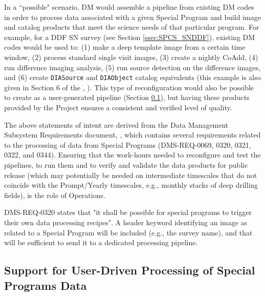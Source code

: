 \documentclass[DM,lsstdoc,toc]{lsstdoc}
\begin{document}
In a ``possible" scenario, DM would assemble a pipeline from existing DM codes in order to process data associated with a given Special Program and build image and catalog products that meet the science needs of that particular program. For example, for a DDF SN survey (see Section \ref{ssec:SPCS_SNDDF}), existing DM codes would be used to: (1) make a deep template image from a certain time window, (2) process standard single visit images, (3) create a nightly CoAdd, (4) run difference imaging analysis, (5) run source detection on the difference images, and (6) create \texttt{DIASource} and \texttt{DIAObject} catalog equivalents (this example is also given in Section 6 of the \DPDD, ). This type of reconfiguration would also be possible to create as a user-generated pipeline (Section \ref{ssec:dmplans_user}), but having these products provided by the Project ensures a consistent and verified level of quality. %

The above statements of intent are derived from the Data Management Subsystem Requirements document, , which contains several requirements related to the processing of data from Special Programs (DMS-REQ-0069, 0320, 0321, 0322, and 0344). 
Ensuring that the work-hours needed to reconfigure and test the pipelines, to run them and to verify and validate the data products for public release (which may potentially be needed on intermediate timescales that do not coincide with the Prompt/Yearly timescales, e.g., monthly stacks of deep drilling fields), is the role of Operations.

DMS-REQ-0320 states that "it shall be possible for special programs to trigger their own data processing recipes".
A header keyword identifying an image as related to a Special Program will be included (e.g., the survey name), and that will be sufficient to send it to a dedicated processing pipeline. 


\subsection{Support for User-Driven Processing of Special Programs Data}\label{ssec:dmplans_user}
\end{document}
